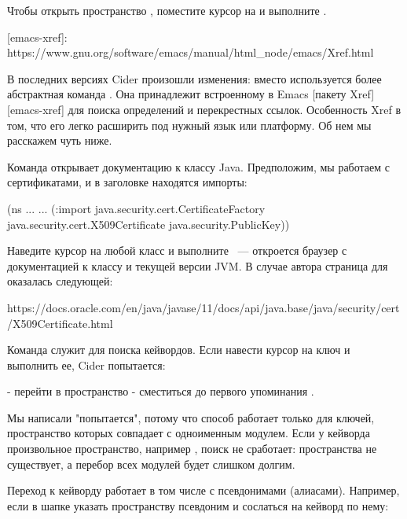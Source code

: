 Чтобы открыть пространство , поместите курсор на  и выполните .

[emacs-xref]: https://www.gnu.org/software/emacs/manual/html\_node/emacs/Xref.html

В последних версиях Cider произошли изменения: вместо  используется более абстрактная команда . Она принадлежит встроенному в Emacs [пакету Xref][emacs-xref] для поиска определений и перекрестных ссылок. Особенность Xref в том, что его легко расширить под нужный язык или платформу. Об нем мы расскажем чуть ниже.

Команда  открывает документацию к классу Java. Предположим, мы работаем с сертификатами, и в заголовке  находятся импорты:

\begin{english}
  \begin{clojure}
(ns ...
  ...
  (:import
   java.security.cert.CertificateFactory
   java.security.cert.X509Certificate
   java.security.PublicKey))
  \end{clojure}
\end{english}

Наведите курсор на любой класс и выполните ~--- откроется браузер с документацией к классу и текущей версии JVM. В случае автора страница для  оказалась следующей:

\begin{english}
  \begin{text}
https://docs.oracle.com/en/java/javase/11/docs/api/java.base/java/security/cert/X509Certificate.html
  \end{text}
\end{english}

Команда  служит для поиска кейвордов. Если навести курсор на ключ  и выполнить ее, Cider попытается:

- перейти в пространство 
- сместиться до первого упоминания .

Мы написали "попытается", потому что способ работает только для ключей, пространство которых совпадает с одноименным модулем. Если у кейворда произвольное пространство, например , поиск не сработает: пространства  не существует, а перебор всех модулей будет слишком долгим.

Переход к кейворду работает в том числе с псевдонимами (алиасами). Например, если в шапке  указать пространству псевдоним  и сослаться на кейворд по нему:

